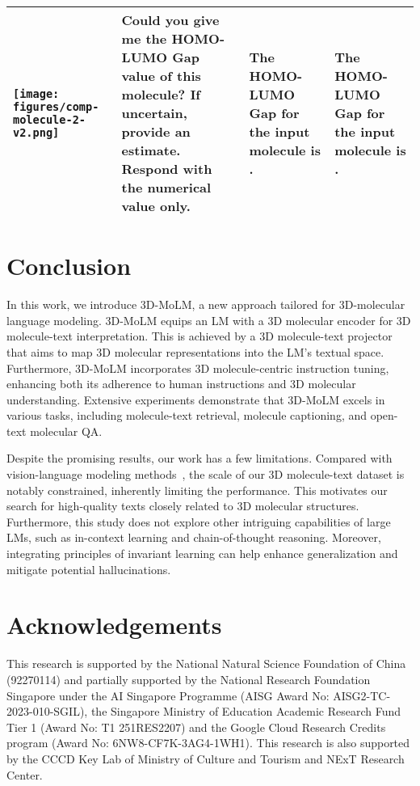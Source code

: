 \begin{table*}[t]
\begin{subtable}[t]{\textwidth}
\begin{tabular}{M{1.8cm} M{5cm} M{2.65cm} M{2.5cm}}
        \midrule
        \texttt{[image: figures/comp-molecule-2-v2.png]} & 
        Could you give me the HOMO-LUMO Gap value of this molecule? If uncertain, provide an estimate. Respond with the numerical value only. & The HOMO-LUMO Gap for the input molecule is . &
        The HOMO-LUMO Gap for the input molecule is . \\
        \bottomrule
    \end{tabular}
\end{subtable}
\label{tab:open-text-qa}
\vspace{-16pt}
\end{table*}\vspace{-0.1cm}
\section{Conclusion}
\vspace{-0.4cm}
In this work, we introduce 3D-MoLM, a new approach tailored for 3D-molecular language modeling. 
3D-MoLM equips an LM with a 3D molecular encoder for 3D molecule-text interpretation.
This is achieved by a 3D molecule-text projector that aims to map 3D molecular representations into the LM's textual space. 
Furthermore, 3D-MoLM incorporates 3D molecule-centric instruction tuning, enhancing both its adherence to human instructions and 3D molecular understanding. 
Extensive experiments demonstrate that 3D-MoLM excels in various tasks, including molecule-text retrieval, molecule captioning, and open-text molecular QA.

Despite the promising results, our work has a few limitations. Compared with vision-language modeling methods~\citep{instructblip, 3D-LLM}, the scale of our 3D molecule-text dataset is notably constrained, inherently limiting the performance.
This motivates our search for high-quality texts closely related to 3D molecular structures.
Furthermore, this study does not explore other intriguing capabilities of large LMs, such as in-context learning and chain-of-thought reasoning. 
Moreover, integrating principles of invariant learning \citep{InvCF,AdvDrop} can help enhance generalization and mitigate potential hallucinations.\section{Acknowledgements}
This research is supported by the National Natural Science Foundation of China (92270114) and partially supported by the National Research Foundation Singapore under the AI Singapore Programme (AISG Award No: AISG2-TC-2023-010-SGIL), the Singapore Ministry of Education Academic Research Fund Tier 1 (Award No: T1 251RES2207) and the Google Cloud Research Credits program (Award No: 6NW8-CF7K-3AG4-1WH1).  
This research is also supported by the CCCD Key Lab of Ministry of Culture and Tourism and NExT Research Center.

\newpage

